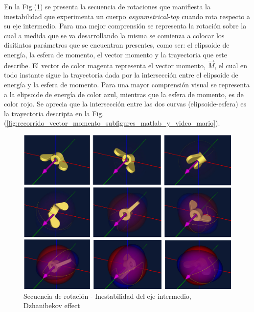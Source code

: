 \documentclass[oneside,a4paper,english,links]{amca}
\begin{document}
En la Fig.(\ref{fig:secuencia_rotacion_inestabilidad_dzhanibekov_effect_wingnut}) se presenta la secuencia de rotaciones que manifiesta la inestabilidad que experimenta un cuerpo \textit{asymmetrical-top} cuando rota respecto a su eje intermedio. Para una mejor comprensi\'on se representa la rotaci\'on sobre la cual a medida que se va desarrollando la misma se comienza a colocar los disitintos par\'ametros que se encuentran  presentes, como ser: el elipsoide de energ\'ia, la esfera de momento, el vector momento y la trayectoria que este describe. El vector de color magenta representa el vector momento, $\vec{M}$, el cual en todo instante sigue la trayectoria dada por la intersecci\'on entre el elipsoide de energ\'ia y la esfera de momento. Para una mayor comprensi\'on visual se representa a la elipsoide de energ\'ia de color azul, mientras que la esfera de momento, es de color rojo. Se aprecia que la intersecci\'on entre las dos curvas (elipsoide-esfera) es la trayectoria descripta en la Fig.(\ref{fig:recorrido_vector_momento_subfigures_matlab_y_video_mario}).


\begin{figure}[H]
\centering
\includegraphics[width=15cm]{Figuras/secuencia_rotacion_inestabilidad.png}
\caption{Secuencia de rotaci\'on -  Inestabilidad del eje intermedio, Dzhanibekov effect}
\label{fig:secuencia_rotacion_inestabilidad_dzhanibekov_effect_wingnut}
\end{figure}
\end{document}
